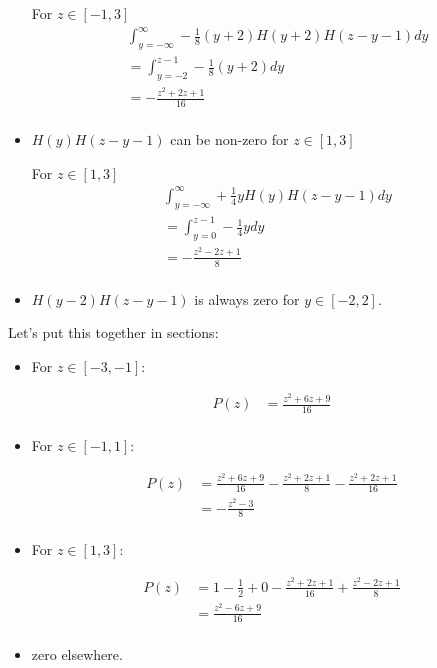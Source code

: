 \begin{itemize}
    For $z \in [-1, 3]$
    \begin{align*}
        &\int_{y =-\infty}^{\infty} - \frac{1}{8}(y+2)H(y+2)H(z-y-1) dy \\
        &= \int_{y=-2}^{z-1} - \frac{1}{8}(y+2) dy \\
        &= -\frac{z^2+2z+1}{16} \\
    \end{align*}

    \item $H(y)H(z-y-1)$ can be non-zero for $z \in [1,3]$

    For $z \in [1, 3]$
    \begin{align*}
        &\int_{y =-\infty}^{\infty} + \frac{1}{4}y H(y)H(z-y-1) dy \\
        &= \int_{y=0}^{z-1} - \frac{1}{4}y dy \\
        &= - \frac{z^2-2z+1}{8} \\
    \end{align*}

    \item $H(y-2)H(z-y-1)$ is always zero for $y \in [-2,2]$.

\end{itemize}

Let's put this together in sections:
\begin{itemize}
    \item For $z \in [-3, -1]$:
    
    \begin{align*}
        P(z) &= \frac{z^2+6z+9}{16} \\
    \end{align*}
    
    \item For $z \in [-1,1]$:
    
    \begin{align*}
        P(z) &= \frac{z^{2}+6z+9}{16}-\frac{z^{2}+2z+1}{8}-\frac{z^{2}+2z+1}{16} \\
        &= -\frac{z^{2}-3}{8} \\
    \end{align*}

    \item For $z \in [1,3]$:
    
    \begin{align*}
        P(z) &= 1-\frac{1}{2}+0-\frac{z^{2}+2z+1}{16}+\frac{z^{2}-2z+1}{8}\\
        &= \frac{z^2 -6z + 9}{16}\\
    \end{align*}

    \item zero elsewhere.
\end{itemize}

